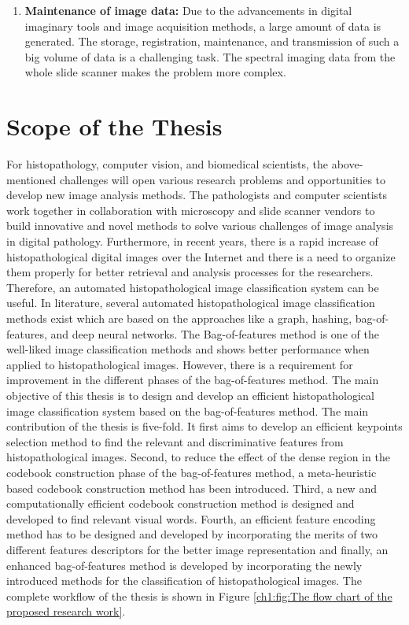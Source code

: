 \begin{enumerate}
\item \textbf{Maintenance of image data:}
Due to the advancements in digital imaginary tools and image acquisition methods, a large amount of data is generated. The storage, registration, maintenance, and transmission of such a big volume of data is a challenging task. The spectral imaging data from the whole slide scanner makes the problem more complex. 

\end{enumerate}

\section{Scope of the Thesis}\label{ch1:sec:Scope of the Thesis}

For histopathology, computer vision, and biomedical scientists, the above-mentioned challenges will open various research problems and opportunities to develop new image analysis methods. The pathologists and computer scientists work together in collaboration with microscopy and slide scanner vendors to build innovative and novel methods to solve various challenges of image analysis in digital pathology. Furthermore, in recent years, there is a rapid increase of histopathological digital images over the Internet and there is a need to organize them properly for better retrieval and analysis processes for the researchers. Therefore, an automated histopathological image classification system can be useful. In literature, several automated histopathological image classification methods exist which are based on the approaches like a graph, hashing, bag-of-features, and deep neural networks. The Bag-of-features method is one of the well-liked image classification methods and shows better performance when applied to histopathological images. However, there is a requirement for improvement in the different phases of the bag-of-features method. The main objective of this thesis is to design and develop an efficient histopathological image classification system based on the bag-of-features method. The main contribution of the thesis is five-fold. It first aims to develop an efficient keypoints selection method to find the relevant and discriminative features from histopathological images. Second, to reduce the effect of the dense region in the codebook construction phase of the bag-of-features method, a meta-heuristic based codebook construction method has been introduced. Third, a new and computationally efficient codebook construction method is designed and developed to find relevant visual words. Fourth, an efficient feature encoding method has to be designed and developed by incorporating the merits of two different features descriptors for the better image representation and finally, an enhanced bag-of-features method is developed by incorporating the newly introduced methods for the classification of histopathological images.  The complete workflow of the thesis is shown in Figure \ref{ch1:fig:The flow chart of the proposed research work}.
